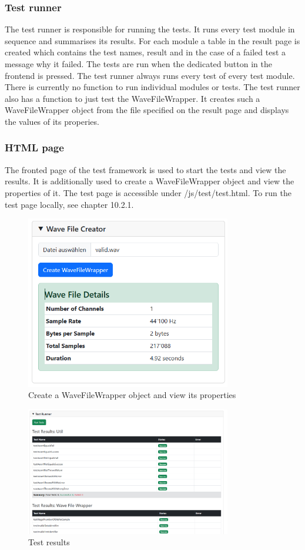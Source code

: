 \subsubsection{Test runner}
The test runner is responsible for running the tests.
It runs every test module in sequence and summarises its results.
For each module a table in the result page is created which contains the test names, result and in the case of a failed test a message why it failed.
The tests are run when the dedicated button in the frontend is pressed.
The test runner always runs every test of every test module.
There is currently no function to run individual modules or tests.
The test runner also has a function to just test the WaveFileWrapper.
It creates such a WaveFileWrapper object from the file specified on the result page and displays the values of its properies.

\subsubsection{HTML page}
The fronted page of the test framework is used to start the tests and view the results.
It is additionally used to create a WaveFileWrapper object and view the properties of it.
The test page is accessible under /js/test/test.html.
To run the test page locally, see chapter 10.2.1.

\begin{figure}[H]
    \centering
    \includegraphics[width=0.8\textwidth]{../assets/wavefilecreator.png}
    \caption{Create a WaveFileWrapper object and view its properties}\label{fig:create-a-wavefilewrapper-object}
\end{figure}

\begin{figure}[H]
    \centering
    \includegraphics[width=0.8\textwidth]{../assets/test_results.png}
    \caption{Test results}\label{fig:test-results}
\end{figure}
